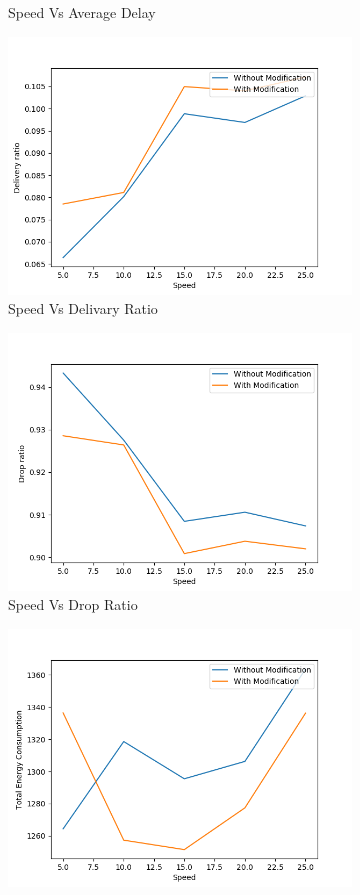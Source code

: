 \begin{figure}[h]
\begin{subfigure}{.5\textwidth}
    \caption{Speed Vs Average Delay}
     \label{speed_delay_modified}
\end{subfigure}
\begin{subfigure}{.5\textwidth}
  \centering
  \includegraphics[width=.8\linewidth]{modified_fig/SpeedvsDeliveryRatio.png}
     \caption{Speed Vs Delivary Ratio}
     \label{speed_delivery_modified}
\end{subfigure}
\begin{subfigure}{.5\textwidth}
  \centering
  \includegraphics[width=.8\linewidth]{modified_fig/SpeedvsDropRatio.png}
     \caption{Speed Vs Drop Ratio}
     \label{speed_drop_modified}
\end{subfigure}
\begin{subfigure}{.5\textwidth}
  \centering
  \includegraphics[width=.8\linewidth]{modified_fig/SpeedvsTotalEnergyConsumption.png}

\end{subfigure}
\end{figure}
